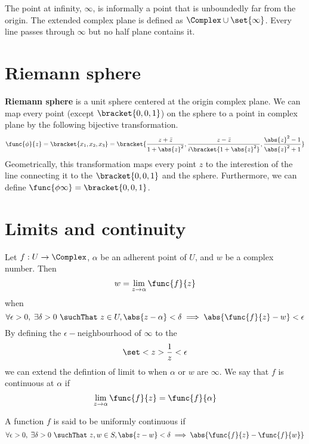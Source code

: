 The point at infinity, \(\infty\), is informally a point that is unboundedly far from the origin. The extended complex plane is defined as \(\Complex \cup \set{\infty}\). Every line passes through \(\infty\) but no half plane contains it.

\section{Riemann sphere}
\textbf{Riemann sphere} is a unit sphere centered at the origin complex plane. We can map every point (except \(\bracket{0,0,1}\)) on the sphere to a point in complex plane by the following bijective transformation.
\begin{equation*}
      \func{\phi}{z} = \bracket{x_1, x_2, x_3}= \bracket{\dfrac{z + \bar{z}}{1 + \abs{z}^2} , \dfrac{z - \bar{z}}{i \bracket{1 + \abs{z}^2}} , \dfrac{ \abs{z}^2 - 1}{\abs{z}^2 + 1} }
\end{equation*}
Geometrically, this transformation maps every point \(z\) to the interestion of the line connecting it to the \(\bracket{0,0,1}\) and the sphere. Furthermore, we can define \(\func{\phi{\infty}} = \bracket{0,0,1}\).

\section{Limits and continuity}

Let \(f : U \to \Complex\), \(\alpha\) be an adherent point of \(U\), and \(w\) be a complex number. Then 
\begin{equation*}
      w = \lim_{z \to \alpha} \func{f}{z} 
\end{equation*}
when 
\begin{equation*}
      \forall \epsilon > 0, \; \exists \delta > 0 \ \suchThat \ z \in U , \abs{z - \alpha} < \delta \implies \abs{\func{f}{z} - w} < \epsilon
\end{equation*}
By defining the \(\epsilon-\)neighbourhood of \(\infty\) to the 
\begin{equation*}
      \set<z>{\dfrac{1}{z} < \epsilon}
\end{equation*}
we can extend the defintion of limit to when \(\alpha\) or \(w\) are \(\infty\).
We say that \(f\) is continuous at \(\alpha\) if 
\begin{equation*}
      \lim_{z \to \alpha} \func{f}{z} = \func{f}{\alpha}
\end{equation*}

\begin{definition}
      A function \(f\) is said to be uniformly continuous if 
      \begin{equation*}
            \forall \epsilon > 0 , \; \exists \delta > 0 \ \suchThat \ z,w \in S , \abs{z - w} < \delta \implies \abs{\func{f}{z} - \func{f}{w}}
      \end{equation*}
\end{definition}

